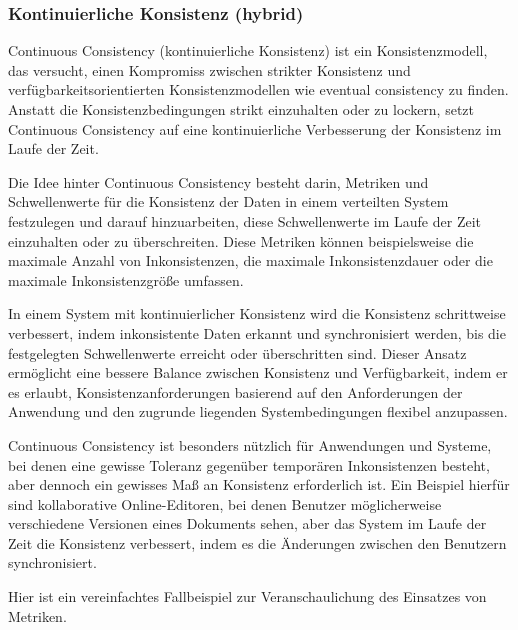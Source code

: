 \documentclass[../vs-script-first-v01.tex]{subfiles}
\begin{document}
\subsubsection{Kontinuierliche Konsistenz (hybrid)}
Continuous Consistency (kontinuierliche Konsistenz) ist ein Konsistenzmodell, das versucht, einen Kompromiss zwischen strikter Konsistenz und verfügbarkeitsorientierten Konsistenzmodellen wie eventual consistency zu finden. Anstatt die Konsistenzbedingungen strikt einzuhalten oder zu lockern, setzt Continuous Consistency auf eine kontinuierliche Verbesserung der Konsistenz im Laufe der Zeit.

Die Idee hinter Continuous Consistency besteht darin, Metriken und Schwellenwerte für die Konsistenz der Daten in einem verteilten System festzulegen und darauf hinzuarbeiten, diese Schwellenwerte im Laufe der Zeit einzuhalten oder zu überschreiten. Diese Metriken können beispielsweise die maximale Anzahl von Inkonsistenzen, die maximale Inkonsistenzdauer oder die maximale Inkonsistenzgröße umfassen.

In einem System mit kontinuierlicher Konsistenz wird die Konsistenz schrittweise verbessert, indem inkonsistente Daten erkannt und synchronisiert werden, bis die festgelegten Schwellenwerte erreicht oder überschritten sind. Dieser Ansatz ermöglicht eine bessere Balance zwischen Konsistenz und Verfügbarkeit, indem er es erlaubt, Konsistenzanforderungen basierend auf den Anforderungen der Anwendung und den zugrunde liegenden Systembedingungen flexibel anzupassen.

Continuous Consistency ist besonders nützlich für Anwendungen und Systeme, bei denen eine gewisse Toleranz gegenüber temporären Inkonsistenzen besteht, aber dennoch ein gewisses Maß an Konsistenz erforderlich ist. Ein Beispiel hierfür sind kollaborative Online-Editoren, bei denen Benutzer möglicherweise verschiedene Versionen eines Dokuments sehen, aber das System im Laufe der Zeit die Konsistenz verbessert, indem es die Änderungen zwischen den Benutzern synchronisiert.

Hier ist ein vereinfachtes Fallbeispiel zur Veranschaulichung des Einsatzes von Metriken.
\end{document}
